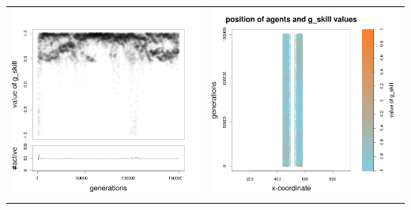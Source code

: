 \documentclass[a4paper,10pt]{article}
\begin{document}
\begin{table}[h!]
\begin{tabular}{cc}
 \newline
 \includegraphics[width=\imgSize]{images/5StaticEnv/Gplot51_staticEnv3}&\includegraphics[width=\imgSize]{images/5StaticEnv/Gplot51Static_staticEnv3}\\

\end{tabular}
\end{table}
\end{document}
